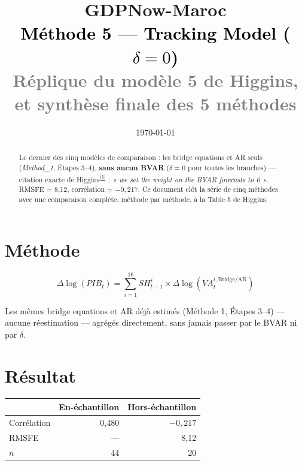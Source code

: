 \documentclass[11pt,a4paper]{article}
\title{\vspace{-1.3cm}\textcolor{bleuprincip}{\Huge\bfseries GDPNow-Maroc}\\[0.3cm]
\textcolor{black}{\Large Méthode 5 --- Tracking Model ($\delta=0$)}\\[0.15cm]
\textcolor{gray}{\large Réplique du modèle 5 de Higgins, et synthèse finale des 5 méthodes}}
\author{}
\date{\today}
\newcommand{\cit}[1]{\textsuperscript{\hyperlink{ref#1}{[#1]}}}
\begin{document}
\maketitle
\thispagestyle{empty}

\begin{abstract}
\noindent Le dernier des cinq modèles de comparaison : les bridge equations et AR seuls (\emph{Method\_1}, Étapes 3--4), \textbf{sans aucun BVAR} ($\delta=0$ pour toutes les branches) --- citation exacte de Higgins\cit{1} : \textit{« we set the weight on the BVAR forecasts to 0 »}. RMSFE = 8,12, corrélation = $-0{,}217$. Ce document clôt la série de cinq méthodes avec une comparaison complète, méthode par méthode, à la Table 5 de Higgins.
\end{abstract}

\tableofcontents
\vspace{0.5cm}

\section{Méthode}

\begin{equation}
\Delta\log(PIB_t) = \sum_{i=1}^{16} SH_{t-1}^i \times \Delta\log(VA_t^{i,\text{Bridge/AR}})
\end{equation}

Les mêmes bridge equations et AR déjà estimés (Méthode 1, Étapes 3--4) --- aucune réestimation --- agrégés directement, sans jamais passer par le BVAR ni par $\delta$.

\section{Résultat}

\begin{center}
\begin{tabular}{lrr}
\toprule
& \textbf{En-échantillon} & \textbf{Hors-échantillon} \\
\midrule
Corrélation & 0,480 & $-0{,}217$ \\
RMSFE & --- & 8,12 \\
$n$ & 44 & 20 \\
\bottomrule
\end{tabular}
\end{center}
\end{document}
